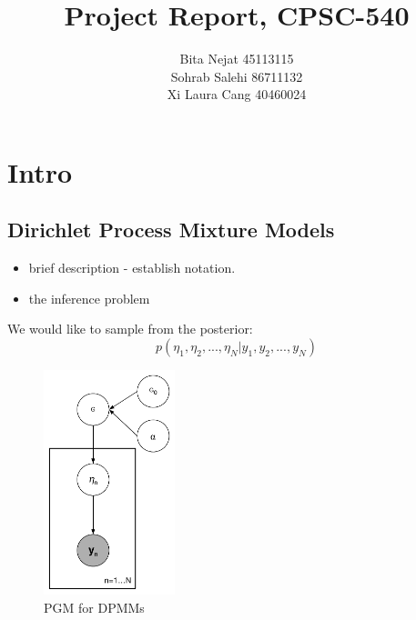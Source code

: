 \documentclass{article}
\title{Project Report, CPSC-540}
\author{
Bita Nejat 45113115 \\
Sohrab Salehi 86711132 \\
Xi Laura Cang 40460024
}
\begin{document}
\maketitle

\section{Intro}

\subsection{Dirichlet Process Mixture Models}

\begin{itemize}
	\item brief description - establish notation.
	\item the inference problem
\end{itemize}

We would like to sample from the posterior:
$$  p(\eta_1, \eta_2, ..., \eta_N | y_1, y_2, ..., y_N) $$ 

\begin{figure}[!h]
\begin{center}
  \includegraphics[width=1.5in]{dpmm_pgm}
\caption{PGM for DPMMs}
  \label{fig:dpmm_pgm}
\end{center}
\end{figure}
\end{document}
